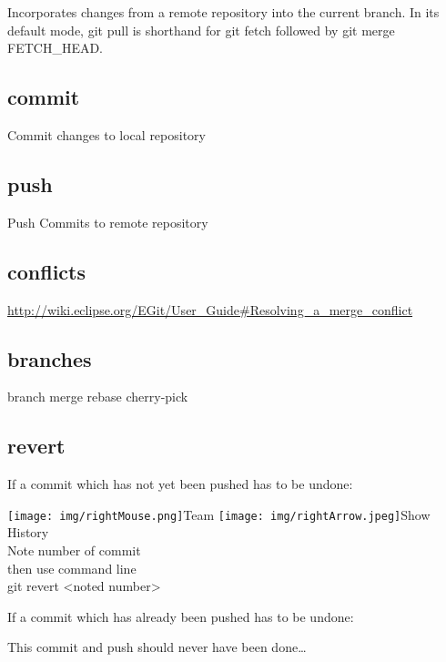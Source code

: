 \documentclass{scrreprt}
\newcommand{\rightMouse}{%
\texttt{[image: img/rightMouse.png]}}
\newcommand{\rightArrow}{%
\texttt{[image: img/rightArrow.jpeg]}\hspace{1mm}}
\newcommand{\layerThree}[1]{\subsection{#1}}
\begin{document}
Incorporates changes from a remote repository into the current branch. 
In its default mode, git pull is shorthand for git fetch followed by git merge FETCH_HEAD.

\layerThree{commit}

Commit changes to local repository

\layerThree{push}

Push Commits to remote repository

\layerThree{conflicts}

\url{http://wiki.eclipse.org/EGit/User_Guide#Resolving_a_merge_conflict}

\layerThree{branches}
branch
merge
rebase
cherry-pick

\layerThree{revert}

If a commit which has not yet been pushed has to be undone:

\rightMouse Team \rightArrow Show History \\
Note number of commit
\\ then use command line \\
{\ttfamily git revert <noted number>}

If a commit which has already been pushed has to be undone:

{\ttfamily This commit and push should never have been done\ldots} 



\nocite{*}

\clearpage
{}
{}


\end{document}

